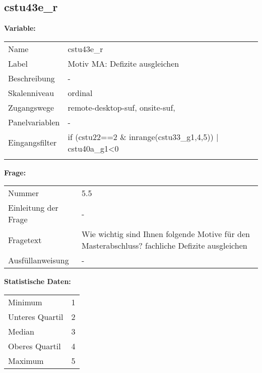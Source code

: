 	
	
	\subsection{cstu43e\_r}
	\label{subSection:cstu43e_r}

	\noindent\textbf{Variable:}\\
		\begin{tabular}{lL{11.3cm}}
			\label{tableVariable:cstu43e_r}
			Name & cstu43e\_r \\
			Label & Motiv MA: Defizite ausgleichen \\
			Beschreibung & - \\
			Skalenniveau & ordinal \\
			Zugangswege &
				remote-desktop-suf,
				onsite-suf,
 \\
			Panelvariablen & -
			 \\
			Eingangsfilter & if (cstu22==2 \& inrange(cstu33\_g1,4,5)) | cstu40a\_g1\textless{}0 \\
 \\
		\end{tabular}

		\vspace*{1 cm}
		\noindent\textbf{Frage:}\\
		\begin{tabular}{lL{11.3cm}}
			\label{tableQuestion:cstu43e_r}
			Nummer & 5.5 \\
			Einleitung der Frage & - \\
			Fragetext & Wie wichtig sind Ihnen folgende Motive für den Masterabschluss?
fachliche Defizite ausgleichen \\
			Ausfüllanweisung & - \\
		\end{tabular}


		\vspace*{1 cm}
		\noindent\textbf{Statistische Daten:}\\
			\begin{tabular}{ll}
				\label{tableStatistics:cstu43e_r}
					Minimum & 1 \\
					Unteres Quartil & 2 \\
					Median & 3 \\
					Oberes Quartil & 4 \\
					Maximum & 5 \\
			\end{tabular}



